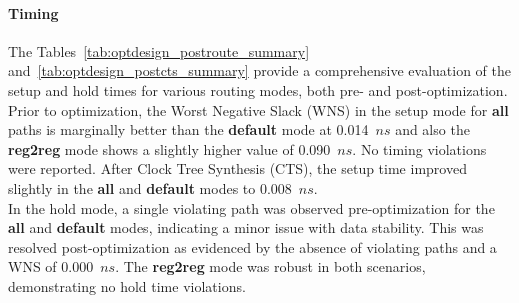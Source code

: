 \paragraph{Timing}
The Tables~\ref{tab:optdesign_postroute_summary} and~\ref{tab:optdesign_postcts_summary} provide a comprehensive evaluation of the setup and hold times for various routing modes, both pre- and post-optimization. Prior to optimization, the Worst Negative Slack (WNS) in the setup mode for \textbf{all} paths is marginally better than the \textbf{default} mode at 0.014~$ns$ and also the \textbf{reg2reg} mode shows a slightly higher value of 0.090~$ns$. No timing violations were reported. After Clock Tree Synthesis (CTS), the setup time improved slightly in the \textbf{all} and \textbf{default} modes to 0.008~$ns$. \\

In the hold mode, a single violating path was observed pre-optimization for the \textbf{all} and \textbf{default} modes, indicating a minor issue with data stability. This was resolved post-optimization as evidenced by the absence of violating paths and a WNS of 0.000~$ns$. The \textbf{reg2reg} mode was robust in both scenarios, demonstrating no hold time violations. \\

